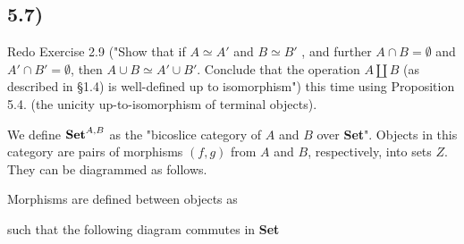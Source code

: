 \documentclass[12pt, letterpaper, twoside]{report}
\begin{document}
\subsection*{5.7)}

Redo Exercise 2.9 ("Show that if $A \simeq A'$ and $B \simeq B'$ , and further $A \cap B = \emptyset$ and $A' \cap B' = \emptyset$, then $A \cup B \simeq A' \cup B'$. Conclude that the operation $A \coprod B$ (as described in §1.4) is well-defined up to isomorphism") this time using Proposition 5.4. (the unicity up-to-isomorphism of terminal objects).

We define $\text{\textbf{Set}}^{A,B}$ as the "bicoslice category of $A$ and $B$ over \textbf{Set}". Objects in this category are pairs of morphisms $(f,g)$ from $A$ and $B$, respectively, into sets $Z$. They can be diagrammed as follows.


Morphisms are defined between objects as


such that the following diagram commutes in \textbf{Set}

\end{document}
